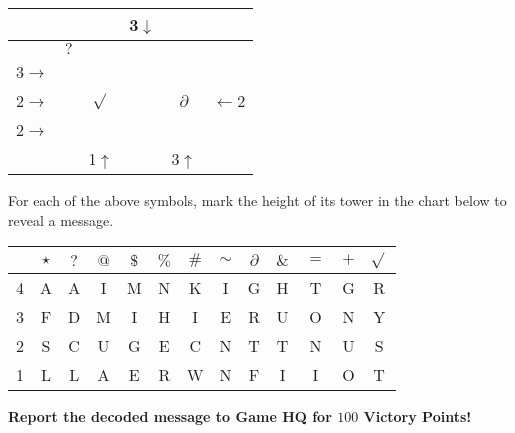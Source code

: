\begin{puzzle}
\begin{multicols}{2}
\begin{center}
\begin{tabular}{c||c|c|c|c||c}
  &           &           & 3\(\downarrow\)         &           &   \\\hline\hline
  & \(?\)     &           &           &           &   \\\hline
3\(\rightarrow\) &           &           &           &           &   \\\hline
2\(\rightarrow\) &           & \(\sqrt{}\) &         & \(\partial\) & \(\leftarrow\)2 \\\hline
2\(\rightarrow\) &           &           &           &           &   \\\hline\hline
  &           & 1\(\uparrow\)         &           & 3\(\uparrow\)         &
\end{tabular}
\end{center}
\end{multicols}

\vfill


For each of the above symbols, mark the height of its tower in the chart
below to reveal a message.

\begin{center}
\begin{tabular}{c||c|c|c|c|c||c|c|c|c|c|c|c}
& \(\star\) & \(?\) & \(@\) & \(\$\) & \(\%\) & \(\#\) & \(\sim\)
& \(\partial\) & \(\&\) & \(=\) & \(+\) & \(\sqrt{}\) \\\hline\hline
4 & A & A & I & M & N & K & I & G & H & T & G & R \\
3 & F & D & M & I & H & I & E & R & U & O & N & Y \\
2 & S & C & U & G & E & C & N & T & T & N & U & S \\
1 & L & L & A & E & R & W & N & F & I & I & O & T
\end{tabular}
\end{center}

\begin{center}
\end{center}
\begin{center}
\end{center}

\vfill

\noindent
\textbf{Report the decoded message to Game HQ for \(100\) Victory Points!}

\vfill

\end{puzzle}

